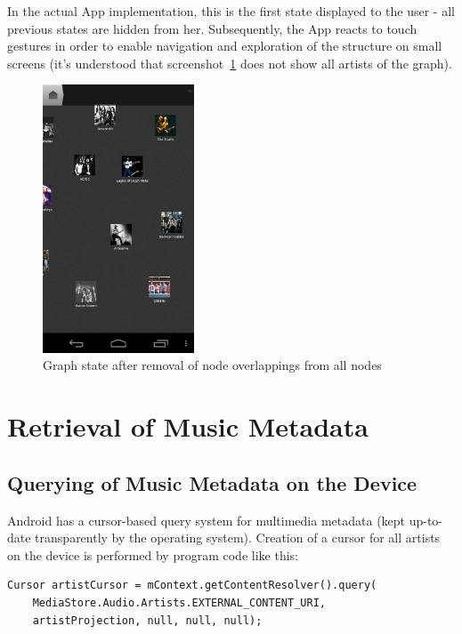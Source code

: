 In the actual App implementation, this is the first state displayed to the user - all previous states are hidden from her. Subsequently, the App reacts to touch gestures in order to enable navigation and exploration of the structure on small screens (it's understood that screenshot~\ref{fig:screen_mds_10_after_all_uncollided_nodes} does not show all artists of the graph).

\begin{figure}[H]
  \centering
    \includegraphics[width=0.4\textwidth]{figures/screen_mds_10_after_all_uncollided_nodes}
  \caption{Graph state after removal of node overlappings from all nodes}
  \label{fig:screen_mds_10_after_all_uncollided_nodes}
\end{figure}

\section{Retrieval of Music Metadata}

\subsection{Querying of Music Metadata on the Device}

Android has a cursor-based query system for multimedia metadata (kept up-to-date transparently by the operating system). Creation of a cursor for all artists on the device is performed by program code like this:

\begin{verbatim}
Cursor artistCursor = mContext.getContentResolver().query(
	MediaStore.Audio.Artists.EXTERNAL_CONTENT_URI,
    artistProjection, null, null, null);
\end{verbatim}

